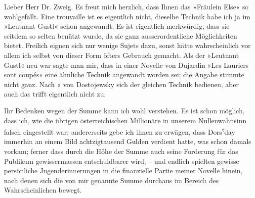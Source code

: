 \pstart{}Lieber Herr Dr. Zweig.\pend\vspace{0.5em}
\pstart
           Es freut mich herzlich, dass Ihnen das »Fräulein
                  Else« so wohlgefällt. Eine trouvaille ist es  eigentlich nicht, dieselbe
               Technik habe ich ja im »Leutnant Gustl« schon
               angewandt. Es ist eigentlich merkwürdig, dass sie seitdem so selten benützt wurde, da
               sie ganz ausserordentliche Möglichkeiten bietet. Freilich eignen sich nur wenige
               Sujets dazu, sonst hätte wahrscheinlich vor allem ich selbst von dieser Form öfters
               Gebrauch gemacht. Als der »Leutnant Gustl« neu
               war sagte man mir, dass in einer Novelle von Dujardin »Les Lauriers sont coupés«
               eine ähnliche Technik angewandt worden sei; die Angabe stimmte nicht ganz. Nach
                  \label{K_L03754-1v}\label{K_L03754-1}« von Dostojewsky
               sich der gleichen Technik bedienen, aber auch das trifft eigentlich nicht zu. \pend
           
\pstart
           Ihr Bedenken wegen der Summe kann ich wohl verstehen. Es ist schon möglich, dass ich,
               wie die übrigen österreichischen Millionäre in
               unserem Nullenwahnsinn \label{K_L03754-2v}\label{K_L03754-2} falsch eingestellt war; andererseits gebe ich ihnen
               zu erwägen, dass Dors\substVorne{}\textsuperscript{t}\substDazwischen{}d\substHinten{}ay immerhin an einem Bild achtzigtausend Gulden verdient hatte, was schon
               damals vorkam; ferner dass durch die Höhe der Summe auch seine Forderung für das
               Publikum gewissermassen entschuldbarer wird; – und endlich spielten gewisse
               persönliche Jugenderinnerungen in die finanzielle Partie meiner Novelle hinein, nach denen sich die von mir genannte
               Summe durchaus im Bereich des Wahrscheinlichen bewegt. \pend
           
